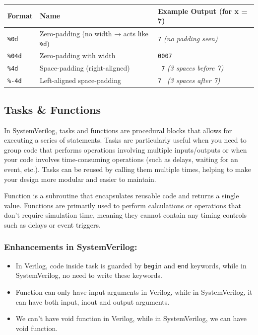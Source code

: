 \documentclass[12pt, a4paper]{article}
\begin{document}
\begin{center}
\begin{tabular}{|l|l|p{}|}
\hline
\textbf{Format} & \textbf{Name} & \textbf{Example Output (for x = 7)} \\
\hline
\texttt{\%0d} & Zero-padding (no width → acts like \texttt{\%d}) & \texttt{7} \textit{(no padding seen)} \\
\hline
\texttt{\%04d} & Zero-padding with width & \texttt{0007} \\
\hline
\texttt{\%4d} & Space-padding (right-aligned) & \texttt{   7} \textit{(3 spaces before 7)} \\
\hline
\texttt{\%-4d} & Left-aligned space-padding & \texttt{7   } \textit{(3 spaces after 7)} \\
\hline
\end{tabular}
\end{center}

\subsection{Tasks \& Functions}

In SystemVerilog, tasks and functions are procedural blocks that allows for executing a series of statements. Tasks are particularly useful when you need to group code that performs operations involving multiple inputs/outputs or when your code involves time-consuming operations (such as delays, waiting for an event, etc.). Tasks can be reused by calling them multiple times, helping to make your design more modular and easier to maintain.

Function is a subroutine that encapsulates reusable code and returns a single value. Functions are primarily used to perform calculations or operations that don't require simulation time, meaning they cannot contain any timing controls such as delays or event triggers.

\subsubsection{Enhancements in SystemVerilog:}

\begin{itemize}
    \item In Verilog, code inside task is guarded by \texttt{begin} and \texttt{end} keywords, while in SystemVerilog, no need to write these keywords.
    \item Function can only have input arguments in Verilog, while in SystemVerilog, it can have both input, inout and output arguments.
    \item We can't have void function in Verilog, while in SystemVerilog, we can have void function.
\end{itemize}
\end{document}
